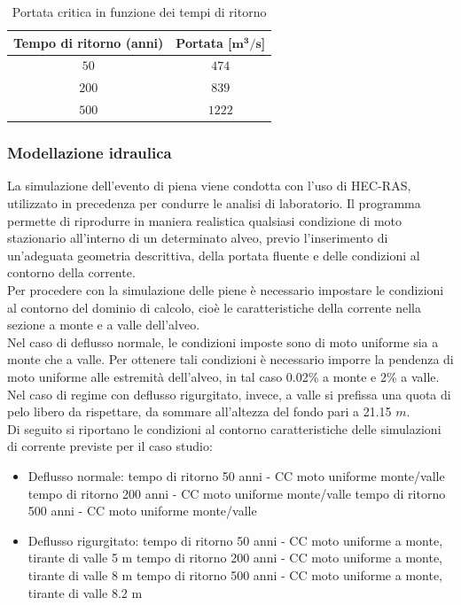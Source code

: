 \documentclass[12pt]{article} %
\begin{document}
\begin{table}[H]
    \centering
    \begin{tabular}{cc}
        \hline
        \textbf{Tempo di ritorno (anni)} & \textbf{Portata [$\mathbf{m^3/s}$]}\\
        \hline
        $50$ & $474$\\
        $200$ & $839$ \\
        $500$ & $1222$\\
        \hline
    \end{tabular}
    \caption{Portata critica in funzione dei tempi di ritorno}
\end{table}

\subsubsection{Modellazione idraulica}
\noindent La simulazione dell'evento di piena viene condotta con l'uso di HEC-RAS, utilizzato in precedenza per condurre le analisi di laboratorio. Il programma permette di riprodurre in maniera realistica qualsiasi condizione di moto stazionario all'interno di un determinato alveo, previo l'inserimento di un'adeguata geometria descrittiva, della portata fluente e delle condizioni al contorno della corrente.\\
Per procedere con la simulazione delle piene è necessario impostare le condizioni al contorno del dominio di calcolo, cioè le caratteristiche della corrente nella sezione a monte e a valle dell'alveo.\\
Nel caso di deflusso normale, le condizioni imposte sono di moto uniforme sia a monte che a valle. Per ottenere tali condizioni è necessario imporre la pendenza di moto uniforme alle estremità dell'alveo, in tal caso 0.02\% a monte e 2\% a valle.\\
Nel caso di regime con deflusso rigurgitato, invece, a valle si prefissa una quota di pelo libero da rispettare, da sommare all'altezza del fondo pari a 21.15 $m$.\\
Di seguito si riportano le condizioni al contorno caratteristiche delle simulazioni di corrente previste per il caso studio:
\begin{itemize}
\item Deflusso normale:
    \subitem tempo di ritorno 50 anni - CC moto uniforme monte/valle
    \subitem tempo di ritorno 200 anni - CC moto uniforme monte/valle
    \subitem tempo di ritorno 500 anni - CC moto uniforme monte/valle
\item Deflusso rigurgitato:
\subitem tempo di ritorno 50 anni - CC moto uniforme a monte, tirante di valle 5 m
\subitem tempo di ritorno 200 anni - CC moto uniforme a monte, tirante di valle 8 m
\subitem tempo di ritorno 500 anni - CC moto uniforme a monte, tirante di valle 8.2 m

    
\end{itemize}
\end{document}
